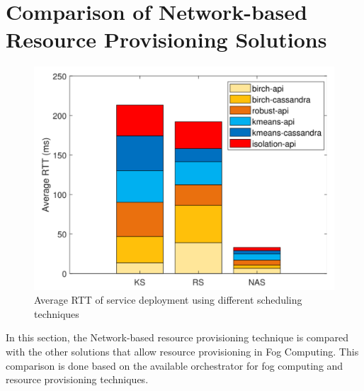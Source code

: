 \section{Comparison of Network-based Resource Provisioning Solutions}
\label{sec:related_work}
\begin{figure}
  \centering
  \includegraphics[width=\linewidth]{figures/mlcn-k8s-scheduler-compare.pdf}
  \caption{Average RTT of service deployment using different scheduling techniques\cite{Santos2019}}
  \label{fig:k8s-comapre-sc}
\end{figure}
In this section, the Network-based resource provisioning technique is compared with the other solutions that allow resource provisioning in Fog Computing. This comparison is done based on the available orchestrator for fog computing and resource provisioning techniques.
